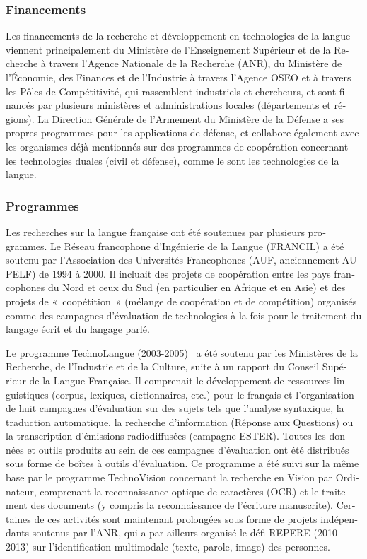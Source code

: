 \begin{french}
\begin{multicols}{2}
\subsubsection{Financements}

Les financements de la recherche et développement en technologies de
la langue viennent principalement du Ministère de l'Enseignement
Supérieur et de la Recherche à travers l'Agence Nationale de la
Recherche (ANR), du Ministère de l'Économie, des Finances et de
l'Industrie à travers l'Agence OSEO et à travers les Pôles de
Compétitivité, qui rassemblent industriels et chercheurs, et sont
financés par plusieurs ministères et administrations locales
(départements et régions). La Direction Générale de l'Armement du
Ministère de la Défense a ses propres programmes pour les applications
de défense, et collabore également avec les organismes déjà mentionnés
sur des programmes de coopération concernant les technologies duales
(civil et défense), comme le sont les technologies de la langue.

\subsubsection{Programmes}

Les recherches sur la langue française ont été soutenues par plusieurs
programmes. Le Réseau francophone d'Ingénierie de la Langue
(FRANCIL) a été soutenu par l'Association des Universités
Francophones (AUF, anciennement AUPELF) de 1994 à 2000. Il incluait
des projets de coopération entre les pays francophones du Nord et ceux
du Sud (en particulier en Afrique et en Asie) et des projets de
«~coopétition~» (mélange de coopération et de compétition) organisés comme
des campagnes d'évaluation de technologies à la fois pour le
traitement du langage écrit et du langage parlé.

Le programme TechnoLangue (2003-2005)~\cite{technolangue} a été
soutenu par les Ministères de la Recherche, de l'Industrie et
de la Culture, suite à un rapport du Conseil Supérieur de la Langue
Française. Il comprenait le développement de ressources linguistiques
(corpus, lexiques, dictionnaires, etc.) pour le français et l'organisation de huit campagnes d'évaluation sur des sujets
tels que l'analyse syntaxique, la traduction automatique, la
recherche d'information (Réponse aux Questions) ou la
transcription d'émissions radiodiffusées (campagne
ESTER). Toutes les données et outils produits au sein de ces campagnes
d'évaluation ont été distribués sous forme de boîtes à outils
d'évaluation. Ce programme a été suivi sur la même base par le
programme TechnoVision concernant la recherche en Vision par
Ordinateur, comprenant la reconnaissance optique de caractères (OCR)
et le traitement des documents (y compris la reconnaissance de l'écriture manuscrite). Certaines de ces activités sont maintenant
prolongées sous forme de projets indépendants soutenus par l'ANR, qui a par ailleurs organisé le défi REPERE (2010-2013) sur
l'identification multimodale (texte, parole, image) des
personnes.


\end{multicols}
\end{french}
